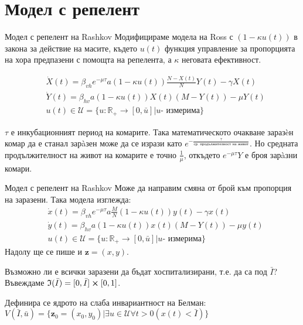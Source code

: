 \section{Модел с репелент}
\begin{frame}[t]{Модел с репелент на Rashkov}
  Модифицираме модела на Ross с $(1 - \kappa u(t))$ в закона за действие на масите, където $u(t)$ функция управление за пропорцията на хора предпазени с помощта на репелента, а $\kappa$ неговата ефективност.

  \begin{equation}
    \label{eq:RepelentProblem}
    \begin{split}
      &\dot{X}(t) = \beta_{vh} e^{-\mu \tau} a (1-\kappa u(t)) \frac{N-X(t)}{N} Y(t) - \gamma X(t) \\
      &\dot{Y}(t) = \beta_{hv} a (1-\kappa u(t)) X(t) (M-Y(t)) - \mu Y(t) \\
      &u(t) \in \mathscr{U} = \{u:\mathbb{R}_+ \rightarrow [0, \bar{u}] \vert u \text{- измерима}\}
    \end{split}
  \end{equation}

  $\tau$ е инкубационният период на комарите. Така математическото очакване заразèн комар да е станал зарàзен може да се изрази като $e^{-\frac{\tau}{\text{ср. продължителност на живот}}}$. Но средната продължителност на живот на комарите е точно $\frac{1}{\mu}$, откъдето $e^{-\mu\tau}Y$ е броя зарàзни комари.
\end{frame}

\begin{frame}[t]{Модел с репелент на Rashkov}
  Може да направим смяна от брой към пропорция на заразени. Така модела изглежда:
  \begin{equation}
    \begin{split}
      &\dot{x}(t) = \beta_{vh} e^{-\mu \tau} a \frac{M}{N} (1-\kappa u(t)) y(t) - \gamma x(t) \\
      &\dot{y}(t) = \beta_{hv} a (1-\kappa u(t)) x(t) (M-Y(t)) - \mu y(t) \\
      &u(t) \in \mathscr{U} = \{u:\mathbb{R}_+ \rightarrow [0, \bar{u}] \vert u \text{- измерима}\}
    \end{split}
  \end{equation}
  Надолу ще се пише и $\boldsymbol{z}=(x,y)$.
  
  Възможно ли е всички заразени да бъдат хоспитализирани, т.е. да са под $\bar{I}$?
  Въвеждаме $\mathfrak{I}(\bar{I}) = [0, \bar{I}] \cross [0, 1]$.

  Дефинира се ядрото на слаба инвариантност на Белман:
  $V(\bar{I}, \bar{u}) = \{\boldsymbol{z}_0=(x_0, y_0) \vert \exists{u \in \mathscr{U}}\forall t>0 \left(x(t) < \bar{I}\right)\}$
\end{frame}

